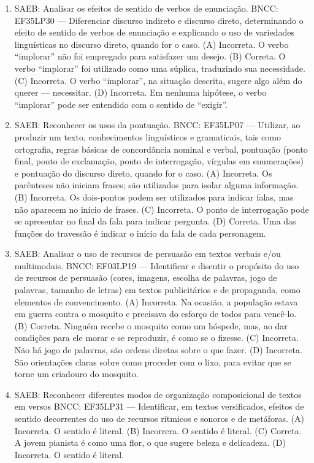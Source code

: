\begin{enumerate}
\item
SAEB: Analisar os efeitos de sentido de verbos de enunciação. 
BNCC: EF35LP30 --- Diferenciar discurso indireto e discurso direto, determinando o efeito de sentido de verbos de enunciação e explicando o uso de variedades linguísticas no discurso direto, quando for o caso. 
(A) Incorreta. O verbo ``implorar'' não foi empregado para satisfazer um desejo. 
(B) Correta. O verbo ``implorar'' foi utilizado como uma súplica, traduzindo sua necessidade. 
(C) Incorreta. O verbo ``implorar'', na situação descrita, sugere algo além do querer --- necessitar. 
(D) Incorreta. Em nenhuma hipótese, o verbo ``implorar'' pode ser
entendido com o sentido de ``exigir''.

\item
SAEB: Reconhecer os usos da pontuação. 
BNCC: EF35LP07 --- Utilizar, ao produzir um texto, conhecimentos linguísticos e gramaticais, tais como ortografia, regras básicas de concordância nominal e verbal, pontuação (ponto final, ponto de exclamação, ponto de interrogação, vírgulas em enumerações) e pontuação do discurso direto, quando for o caso. 
(A) Incorreta. Os parênteses não iniciam frases; são utilizados para isolar alguma informação. 
(B) Incorreta. Os dois-pontos podem ser utilizados para indicar falas, mas não aparecem no início de frases. 
(C) Incorreta. O ponto de interrogação pode se apresentar no final da fala para indicar pergunta. 
(D) Correta. Uma das funções do travessão é indicar o início da fala de cada personagem.

\item
SAEB: Analisar o uso de recursos de persuasão em textos verbais e/ou multimodais. 
BNCC: EF03LP19 --- Identificar e discutir o propósito do uso de recursos de persuasão (cores, imagens, escolha de palavras, jogo de palavras, tamanho de letras) em textos publicitários e de propaganda, como elementos de convencimento. 
(A) Incorreta. Na ocasião, a população estava em guerra contra o mosquito e precisava do esforço de todos para vencê-lo. 
(B) Correta. Ninguém recebe o mosquito como um hóspede, mas, ao dar condições para ele morar e se reproduzir, é como se o fizesse. 
(C) Incorreta. Não há jogo de palavras, são ordens diretas sobre o que fazer. 
(D) Incorreta. São orientações claras sobre como proceder com o lixo, para evitar que se torne um criadouro do mosquito.

\item
SAEB: Reconhecer diferentes modos de organização composicional de textos em versos 
BNCC: EF35LP31 --- Identificar, em textos versificados, efeitos de sentido decorrentes do uso de recursos rítmicos e sonoros e de metáforas. 
(A) Incorreta. O sentido é literal. 
(B) Incorrera. O sentido é literal. 
(C) Correta. A jovem pianista é como uma flor, o que sugere beleza e delicadeza. 
(D) Incorreta. O sentido é literal.


\end{enumerate}

